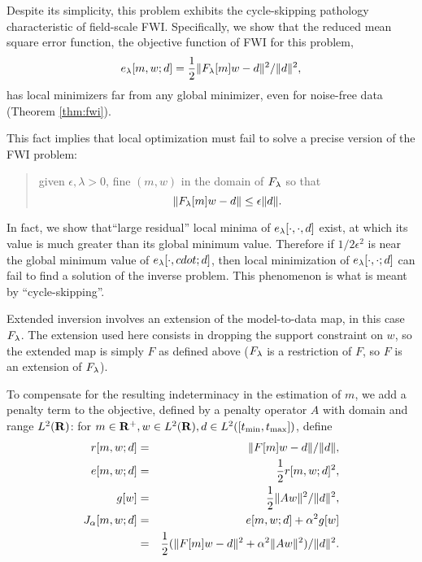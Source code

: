 Despite its simplicity, this problem exhibits the cycle-skipping
pathology characteristic of field-scale FWI. Specifically, we show
that the reduced mean square error function, the objective function of
FWI for this problem,
\begin{equation}
  \label{eqn:redms}
  e_{\lambda}[m,w;d]=\frac{1}{2}\|F_{\lambda}[m]w-d\|^2/\|d\|^2,
\end{equation}
has local minimizers far from any global minimizer, even for noise-free
data (Theorem \ref{thm:fwi}).

This fact implies that local optimization must fail to solve a precise
version of the FWI problem:
\begin{quote} given $\epsilon, \lambda > 0$, fine $(m,w)$ in the
domain of $F_{\lambda}$ so that
\begin{equation}
  \label{eqn:probstat}
  \|F_{\lambda}[m]w-d\| \le \epsilon\|d\|.
\end{equation}
\end{quote}
In fact, we show
that``large residual'' local minima of $e_{\lambda}[\cdot,\cdot,d]$ exist,
at which its value is much greater than its global minimum
value. Therefore if $1/2\epsilon^2$ is near the global minimum value
of $e_{\lambda}[\cdot,cdot;d]$, then
local minimization of $e_{\lambda}[\cdot,\cdot;d]$ can fail to find a
solution of the inverse problem. This phenomenon is what is meant by
``cycle-skipping''.

Extended inversion involves an extension of the model-to-data map, in
this case $F_{\lambda}$.  The extension used here consists in dropping the
support constraint on $w$, so the extended map is simply $F$ as
defined above ($F_{\lambda}$ is a restriction of $F$, so $F$ is an extension
of $F_{\lambda}$).

To compensate for the resulting indeterminacy in the
estimation of $m$, we add a penalty term to the objective, defined by
a penalty operator $A$ with domain and range $L^2({\bf R})$: for $m \in
{\bf R}^+,w\in L^2({\bf R}), d \in L^2([t_{\rm min},t_{\rm max}])$, define
\begin{eqnarray}
  r[m,w;d] & = & \|F[m]w-d\|/\|d\|, \label{eqn:rmserr}\\
  e[m,w;d] & = & \frac{1}{2}r[m,w;d]^2, \label{eqn:mserr}\\
  g[w] & = & \frac{1}{2}\|Aw\|^2/\|d\|^2, \label{eqn:pen} \\
  J_{\alpha}[m, w;d] &=& e[m,w;d] + \alpha^2 g[w] \nonumber\\
  &=& \frac{1}{2}(\|F[m]w-d\|^2 + \alpha^2 \|Aw\|^2)/\|d\|^2.
\label{eqn:penerr}
\end{eqnarray}

